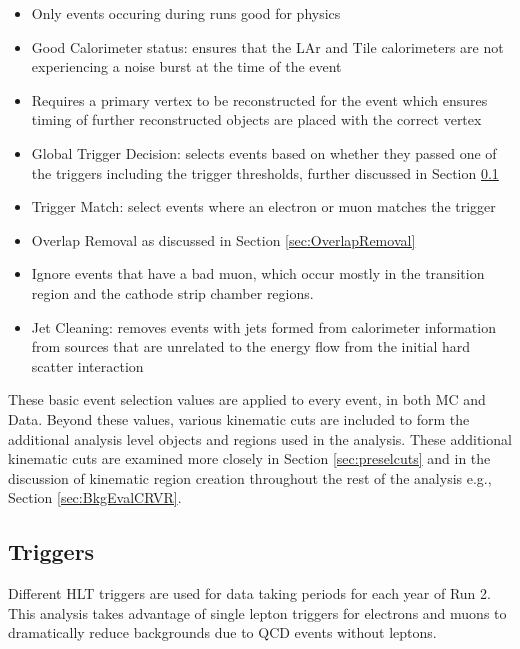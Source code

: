 \begin{itemize}
\item Only events occuring during runs good for physics
\item Good Calorimeter status: ensures that the LAr and Tile calorimeters are not experiencing a noise burst at the time of the event
\item Requires a primary vertex to be reconstructed for the event which ensures timing of further reconstructed objects are placed with the correct vertex
\item Global Trigger Decision: selects events based on whether they passed one of the triggers including the trigger thresholds, further discussed in Section \ref{sec:GTRIGDEC}
\item Trigger Match: select events where an electron or muon matches the trigger
\item Overlap Removal as discussed in Section \ref{sec:OverlapRemoval}
\item Ignore events that have a bad muon, which occur mostly in the transition region and the cathode strip chamber regions.
\item Jet Cleaning: removes events with jets formed from calorimeter information from sources that are unrelated to the energy flow from the initial hard scatter interaction
\end{itemize}

These basic event selection values are applied to every event, in both MC and Data.  Beyond these values, various kinematic cuts are included to form the additional analysis level objects and regions used in the analysis.  These additional kinematic cuts are examined more closely in Section \ref{sec:preselcuts} and in the discussion of kinematic region creation throughout the rest of the analysis e.g., Section \ref{sec:BkgEvalCRVR}.

\subsection{Triggers}
\label{sec:GTRIGDEC}
Different HLT triggers are used for data taking periods for each year of Run 2.  This analysis takes advantage of single lepton triggers for electrons and muons to dramatically reduce backgrounds due to QCD events without leptons.  

